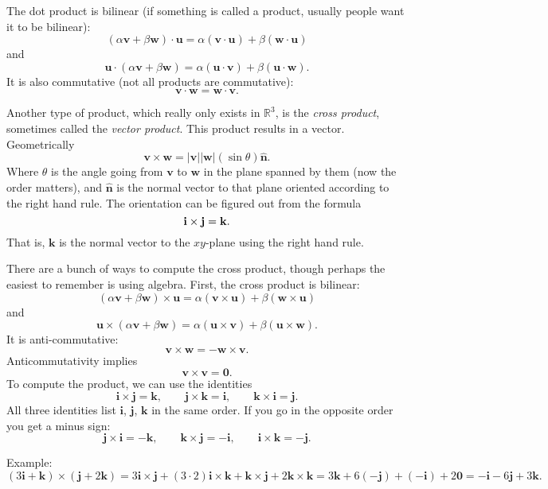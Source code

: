 \documentclass[12pt]{article}
\newcommand{\sabs}[1]{\lvert {#1} \rvert}
\newcommand{\R}{{\mathbb{R}}}
\newcommand{\veci}{\mathbf{i}}
\newcommand{\vecj}{\mathbf{j}}
\newcommand{\veck}{\mathbf{k}}
\newcommand{\avoidbreak}{\postdisplaypenalty=100}
\begin{document}
The dot product is bilinear (if something is called a product, usually people want it to be bilinear):
\[
( \alpha \mathbf{v} + \beta \mathbf{w} ) \cdot \mathbf{u}
=
\alpha (\mathbf{v} \cdot \mathbf{u}) + \beta (\mathbf{w} \cdot \mathbf{u})
\]
and
\[
\mathbf{u} \cdot
( \alpha \mathbf{v} + \beta \mathbf{w} )
=
\alpha (\mathbf{u} \cdot \mathbf{v}) + \beta (\mathbf{u} \cdot \mathbf{w}) .
\]
It is also commutative (not all products are commutative):
\[
\mathbf{v} \cdot \mathbf{w} = \mathbf{w} \cdot \mathbf{v} .
\]

Another type of product, which really only exists in $\R^3$, is the
\emph{cross product},
sometimes called the \emph{vector product}.
This product results in a vector.
Geometrically
\[
\mathbf{v} \times \mathbf{w} = \sabs{\mathbf{v}} \sabs{\mathbf{w}} (\sin \theta) \hat{\mathbf{n}} .
\]
Where $\theta$ is the angle going from $\mathbf{v}$ to $\mathbf{w}$ in the plane spanned by them
(now the order matters),
and $\hat{\mathbf{n}}$ is the normal vector to that plane oriented according to the right hand rule.
The orientation can be figured out from the formula
\[
\veci \times \vecj = \veck .
\avoidbreak
\]
That is, $\veck$ is the normal vector to the $xy$-plane using the right hand rule.

There are a bunch of ways to compute the cross product, though perhaps the easiest to remember
is using algebra.
First, the cross product is bilinear:
\[
( \alpha \mathbf{v} + \beta \mathbf{w} ) \times \mathbf{u}
=
\alpha (\mathbf{v} \times \mathbf{u}) + \beta (\mathbf{w} \times \mathbf{u})
\]
and
\[
\mathbf{u} \times
( \alpha \mathbf{v} + \beta \mathbf{w} )
=
\alpha (\mathbf{u} \times \mathbf{v}) + \beta (\mathbf{u} \times \mathbf{w}) .
\]
It is anti-commutative:
\[
\mathbf{v} \times \mathbf{w} = - \mathbf{w} \times \mathbf{v} .
\]
Anticommutativity implies
\[
\mathbf{v} \times \mathbf{v} = \mathbf{0} .
\]
To compute the product, we can use the identities
\[
\veci \times \vecj = \veck , \qquad
\vecj \times \veck = \veci , \qquad
\veck \times \veci = \vecj .
\]
All three identities list $\veci$, $\vecj$, $\veck$ in the same order.
If you go in the opposite order you get a minus sign:
\[
\vecj \times \veci = -\veck , \qquad
\veck \times \vecj = -\veci , \qquad
\veci \times \veck = -\vecj .
\]

Example:
\[
(3 \veci + \veck) \times (\vecj + 2 \veck)
=
3 \veci \times \vecj + (3 \cdot 2) \veci \times \veck
+
\veck \times \vecj + 2 \veck \times \veck
=
3 \veck + 6 ( - \vecj)
+
(-\veci) + 2 \mathbf{0}
=
-\veci - 6\vecj + 3 \veck .
\]
\end{document}
